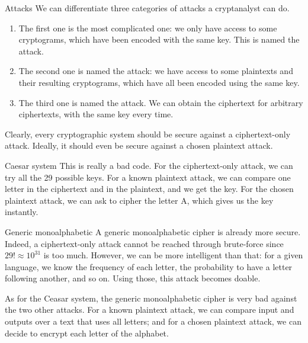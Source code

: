 \documentclass[a4paper]{article}
\begin{document}
\begin{parag}{Attacks}
    We can differentiate three categories of attacks a cryptanalyst can do. 
    \begin{enumerate}[left=0pt]
        \item The first one is the most complicated one: we only have access to some cryptograms, which have been encoded with the same key. This is named the  attack.
        \item The second one is named the  attack: we have access to some plaintexts and their resulting cryptograms, which have all been encoded using the same key.
        \item The third one is named the  attack. We can obtain the ciphertext for arbitrary ciphertexts, with the same key every time.
    \end{enumerate}

    Clearly, every cryptographic system should be secure against a ciphertext-only attack. Ideally, it should even be secure against a chosen plaintext attack.

    \begin{subparag}{Caesar system}
        This is really a bad code. For the ciphertext-only attack, we can try all the 29 possible keys. For a known plaintext attack, we can compare one letter in the ciphertext and in the plaintext, and we get the key. For the chosen plaintext attack, we can ask to cipher the letter A, which gives us the key instantly. 
    \end{subparag}
    
    \begin{subparag}{Generic monoalphabetic}
        A generic monoalphabetic cipher is already more secure. Indeed, a ciphertext-only attack cannot be reached through brute-force since $29! \approx 10^{31}$ is too much. However, we can be more intelligent than that: for a given language, we know the frequency of each letter, the probability to have a letter following another, and so on. Using those, this attack becomes doable.

        As for the Ceasar system, the generic monoalphabetic cipher is very bad against the two other attacks. For a known plaintext attack, we can compare input and outputs over a text that uses all letters; and for a chosen plaintext attack, we can decide to encrypt each letter of the alphabet.
    \end{subparag}


\end{parag}
\end{document}
